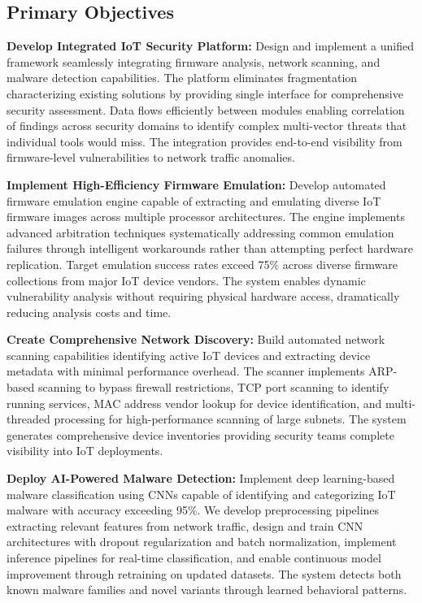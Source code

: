 \subsection{Primary Objectives}

\textbf{Develop Integrated IoT Security Platform:} Design and implement a unified framework seamlessly integrating firmware analysis, network scanning, and malware detection capabilities. The platform eliminates fragmentation characterizing existing solutions by providing single interface for comprehensive security assessment. Data flows efficiently between modules enabling correlation of findings across security domains to identify complex multi-vector threats that individual tools would miss. The integration provides end-to-end visibility from firmware-level vulnerabilities to network traffic anomalies.

\textbf{Implement High-Efficiency Firmware Emulation:} Develop automated firmware emulation engine capable of extracting and emulating diverse IoT firmware images across multiple processor architectures. The engine implements advanced arbitration techniques systematically addressing common emulation failures through intelligent workarounds rather than attempting perfect hardware replication. Target emulation success rates exceed 75\% across diverse firmware collections from major IoT device vendors. The system enables dynamic vulnerability analysis without requiring physical hardware access, dramatically reducing analysis costs and time.

\textbf{Create Comprehensive Network Discovery:} Build automated network scanning capabilities identifying active IoT devices and extracting device metadata with minimal performance overhead. The scanner implements ARP-based scanning to bypass firewall restrictions, TCP port scanning to identify running services, MAC address vendor lookup for device identification, and multi-threaded processing for high-performance scanning of large subnets. The system generates comprehensive device inventories providing security teams complete visibility into IoT deployments.

\textbf{Deploy AI-Powered Malware Detection:} Implement deep learning-based malware classification using CNNs capable of identifying and categorizing IoT malware with accuracy exceeding 95\%. We develop preprocessing pipelines extracting relevant features from network traffic, design and train CNN architectures with dropout regularization and batch normalization, implement inference pipelines for real-time classification, and enable continuous model improvement through retraining on updated datasets. The system detects both known malware families and novel variants through learned behavioral patterns.

